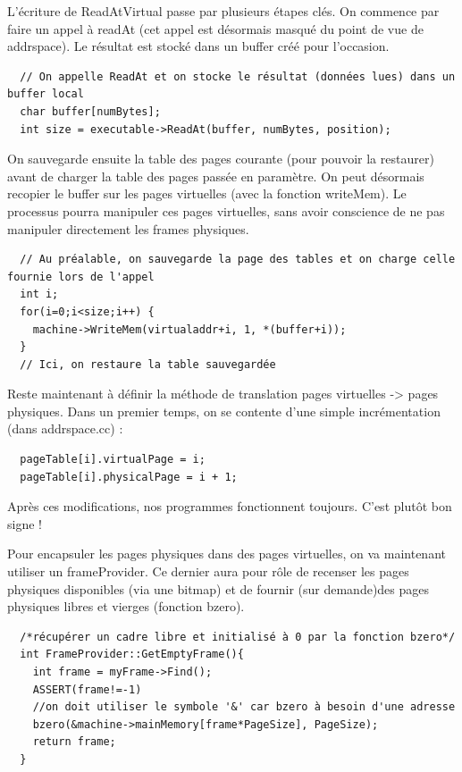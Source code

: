 \documentclass[a4paper,10pt]{article}
\begin{document}
  L'écriture de ReadAtVirtual passe par plusieurs étapes clés. On commence par faire un appel à readAt (cet appel est désormais masqué du point de vue de addrspace). Le résultat est stocké dans un buffer créé pour l'occasion.

  \begin{lstlisting}
  // On appelle ReadAt et on stocke le résultat (données lues) dans un buffer local
  char buffer[numBytes];
  int size = executable->ReadAt(buffer, numBytes, position);
  \end{lstlisting}

  On sauvegarde ensuite la table des pages courante (pour pouvoir la restaurer) avant de charger la table des pages passée en paramètre. On peut désormais recopier le buffer sur les pages virtuelles (avec la fonction writeMem). Le processus pourra manipuler ces pages virtuelles, sans avoir conscience de ne pas manipuler directement les frames physiques.

  \begin{lstlisting}
  // Au préalable, on sauvegarde la page des tables et on charge celle fournie lors de l'appel
  int i;
  for(i=0;i<size;i++) {
    machine->WriteMem(virtualaddr+i, 1, *(buffer+i));
  }
  // Ici, on restaure la table sauvegardée
  \end{lstlisting}

  Reste maintenant à définir la méthode de translation pages virtuelles -> pages physiques. Dans un premier temps, on se contente d'une simple incrémentation (dans addrspace.cc) :

  \begin{lstlisting}
  pageTable[i].virtualPage = i;
  pageTable[i].physicalPage = i + 1;
  \end{lstlisting}

  Après ces modifications, nos programmes fonctionnent toujours. C'est plutôt bon signe !

  Pour encapsuler les pages physiques dans des pages virtuelles, on va maintenant utiliser un frameProvider. Ce dernier aura pour rôle de recenser les pages physiques disponibles (via une bitmap) et de fournir (sur demande)des pages physiques libres et vierges (fonction bzero).

  \begin{lstlisting}
  /*récupérer un cadre libre et initialisé à 0 par la fonction bzero*/
  int FrameProvider::GetEmptyFrame(){
    int frame = myFrame->Find();
    ASSERT(frame!=-1)
    //on doit utiliser le symbole '&' car bzero à besoin d'une adresse
    bzero(&machine->mainMemory[frame*PageSize], PageSize);
    return frame;
  }
  \end{lstlisting}
\end{document}
